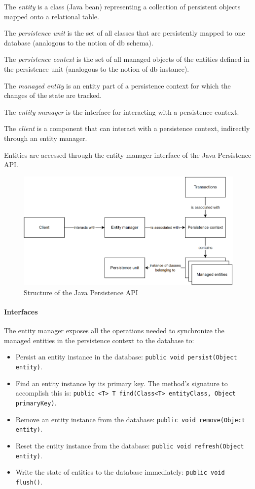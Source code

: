 \begin{definition}
    The \emph{entity} is a class (Java bean) representing a collection of persistent objects mapped onto a relational table. 

    The \emph{persistence unit} is the set of all classes that are persistently mapped to one database (analogous to the notion of db schema). 

    The \emph{persistence context} is the set of all managed objects of the entities defined in the persistence unit (analogous to the notion of db instance). 

    The \emph{managed entity} is an entity part of a persistence context for which the changes of the state are tracked. 

    The \emph{entity manager} is the interface for interacting with a persistence context. 
    
    The \emph{client} is a component that can interact with a persistence context, indirectly through an entity manager.
\end{definition}
Entities are accessed through the entity manager interface of the Java Persistence API.
\begin{figure}[H]
    \centering
    \includegraphics[width=0.6\linewidth]{images/jpa.png}
    \caption{Structure of the Java Persistence API}
\end{figure}

\paragraph*{Interfaces}
The entity manager exposes all the operations needed to synchronize the managed entities in the persistence context to the database to:
\begin{itemize}
    \item Persist an entity instance in the database: \texttt{public void persist(Object entity)}.
    \item Find an entity instance by its primary key. 
        The method's signature to accomplish this is: \texttt{public <T> T find(Class<T> entityClass, Object primaryKey)}.
    \item Remove an entity instance from the database: \texttt{public void remove(Object entity)}.
    \item Reset the entity instance from the database: \texttt{public void refresh(Object entity)}.
    \item Write the state of entities to the database immediately: \texttt{public void flush()}.
\end{itemize}

